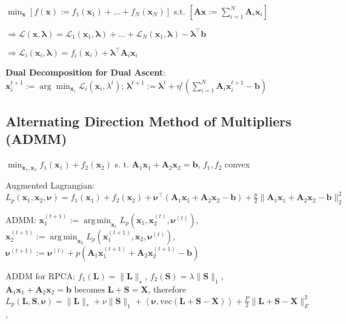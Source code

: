 \documentclass[a4paper, 11pt, landscape]{article}
\DeclareMathOperator*{\argmin}{arg\,min}
\begin{document}
\begin{multicols*}{3}
$\min_\mathbf{x} \left[ f(\mathbf{x}) := f_1(\mathbf{x}_1) + \dots + f_N(\mathbf{x}_N) \right]$
s.t.
$\left[ \mathbf{A}\mathbf{x} := \sum_{i=1}^{N} \mathbf{A}_i \mathbf{x}_i \right]$

$\Rightarrow \mathcal{L}(\mathbf{x},\bm{\lambda}) = \mathcal{L}_1(\mathbf{x}_1, \bm{\lambda}) + \dots + \mathcal{L}_N(\mathbf{x}_1, \bm{\lambda}) - \bm{\lambda}^\top\mathbf{b}$

$\Rightarrow \mathcal{L}_i(\mathbf{x}_i,\bm{\lambda}) = f_i(\mathbf{x}_i) + \bm{\lambda}^\top \mathbf{A}_i \mathbf{x}_i$

\textbf{Dual Decomposition for Dual Ascent}: 
\\$\mathbf{x}_i^{t+1} := \arg\min_{\mathbf{x}_i} \mathcal{L}_i(\mathbf{x}_i,\lambda^t)$; 
$\bm{\lambda}^{t+1} := \bm{\lambda}^t + \eta^t \left( \sum_{i=1}^{N} \mathbf{A}_i \mathbf{x}_i^{t+1} -\mathbf{b} \right) $




\subsection{Alternating Direction Method of Multipliers (ADMM)}
$\min_{\mathbf{x}_1, \mathbf{x}_2} f_1(\mathbf{x}_1) + f_2(\mathbf{x}_2)$ s. t. $\mathbf{A}_1 \mathbf{x}_1 + \mathbf{A}_2 \mathbf{x}_2 = \mathbf{b}$, $f_1, f_2$ convex
\begin{inparaitem}[\color{red}\textbullet]
	\item Augmented Lagrangian: $L_p(\mathbf{x}_1, \mathbf{x}_2, \boldsymbol{\nu}) = f_1(\mathbf{x}_1) + f_2(\mathbf{x}_2) + \boldsymbol{\nu}^\top (\mathbf{A}_1 \mathbf{x}_1 + \mathbf{A}_2 \mathbf{x}_2 - \mathbf{b}) + \frac{p}{2}\| \mathbf{A}_1 \mathbf{x}_1 + \mathbf{A}_2 \mathbf{x}_2 - \mathbf{b} \|_2^2$
	\item ADMM: $\mathbf{x}_1^{(t+1)} := \argmin_{\mathbf{x}_1} L_p(\mathbf{x}_1, \mathbf{x}_2^{(t)}, \boldsymbol{\nu}^{(t)})$, $\mathbf{x}_2^{(t+1)} := \argmin_{\mathbf{x}_2} L_p(\mathbf{x}_1^{(t+1)}, \mathbf{x}_2, \boldsymbol{\nu}^{(t)})$, $\boldsymbol{\nu}^{(t+1)} := \boldsymbol{\nu}^{(t)} + p(\mathbf{A}_1 \mathbf{x}_1^{(t+1)} + \mathbf{A}_2 \mathbf{x}_2^{(t+1)} - \mathbf{b})$
	\item ADDM for RPCA: $f_1(\mathbf{L}) = \|\mathbf{L}\|_\star$, $f_2(\mathbf{S}) = \lambda \| \mathbf{S} \|_1$, $\mathbf{A}_1 \mathbf{x}_1 + \mathbf{A}_2 \mathbf{x}_2 = \mathbf{b} \text{ becomes } \mathbf{L} + \mathbf{S} = \mathbf{X}$, therefore $L_p(\mathbf{L}, \mathbf{S}, \boldsymbol{\nu}) = \|\mathbf{L}\|_* + \nu \|\mathbf{S}\|_1 + \left< \bm{\nu}, \mathrm{vec}(\mathbf{L}+\mathbf{S}-\mathbf{X}) \right> + \frac{P}{2} \| \mathbf{L}+ \mathbf{S} - \mathbf{X} \|_F^2$, 

\end{inparaitem}

\raggedcolumns
\end{multicols*}
\end{document}
